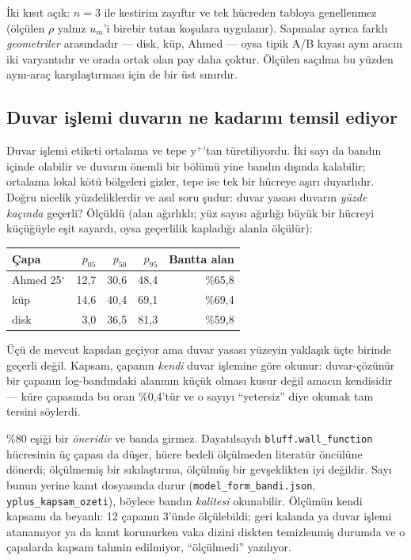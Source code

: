 \documentclass[11pt,a4paper]{article}
\begin{document}
\noindent İki kısıt açık: $n{=}3$ ile kestirim zayıftır ve tek hücreden tabloya
genellenmez (ölçülen $\rho$ yalnız $u_m$'i birebir tutan koşulara uygulanır).
Sapmalar ayrıca farklı \emph{geometriler} arasındadır --- disk, küp, Ahmed ---
oysa tipik A/B kıyası aynı aracın iki varyantıdır ve orada ortak olan pay daha
çoktur. Ölçülen saçılma bu yüzden aynı-araç karşılaştırması için de bir üst
sınırdır.

\subsection{Duvar işlemi duvarın ne kadarını temsil ediyor}
\label{sub:yplus-kapsam}

Duvar işlemi etiketi ortalama ve tepe y$^+$'tan türetiliyordu. İki sayı da
bandın içinde olabilir ve duvarın önemli bir bölümü yine bandın dışında
kalabilir; ortalama lokal kötü bölgeleri gizler, tepe ise tek bir hücreye
aşırı duyarlıdır. Doğru nicelik yüzdeliklerdir ve asıl soru şudur: duvar
yasası duvarın \emph{yüzde kaçında} geçerli? Ölçüldü (alan ağırlıklı; yüz
sayısı ağırlığı büyük bir hücreyi küçüğüyle eşit sayardı, oysa geçerlilik
kapladığı alanla ölçülür):

\begin{center}
\begin{tabular}{lrrrr}
\toprule
Çapa & $p_{05}$ & $p_{50}$ & $p_{95}$ & Bantta alan \\
\midrule
Ahmed 25$^\circ$ & 12{,}7 & 30{,}6 & 48{,}4 & \%65{,}8 \\
küp & 14{,}6 & 40{,}4 & 69{,}1 & \%69{,}4 \\
disk & 3{,}0 & 36{,}5 & 81{,}3 & \%59{,}8 \\
\bottomrule
\end{tabular}
\end{center}

\noindent Üçü de mevcut kapıdan geçiyor ama duvar yasası yüzeyin yaklaşık
üçte birinde geçerli değil. Kapsam, çapanın \emph{kendi} duvar işlemine göre
okunur: duvar-çözünür bir çapanın log-bandındaki alanının küçük olması kusur
değil amacın kendisidir --- küre çapasında bu oran \%0{,}4'tür ve o sayıyı
``yetersiz'' diye okumak tam tersini söylerdi.

\%80 eşiği bir \emph{öneridir} ve banda girmez. Dayatılsaydı
\texttt{bluff.wall\_function} hücresinin üç çapası da düşer, hücre bedeli
ölçülmeden literatür öncülüne dönerdi; ölçülmemiş bir sıkılaştırma, ölçülmüş
bir gevşeklikten iyi değildir. Sayı bunun yerine kanıt dosyasında durur
(\texttt{model\_form\_bandi.json}, \texttt{yplus\_kapsam\_ozeti}), böylece
bandın \emph{kalitesi} okunabilir. Ölçümün kendi kapsamı da beyanlı: 12
çapanın 3'ünde ölçülebildi; geri kalanda ya duvar işlemi atanamıyor ya da
kanıt korunurken vaka dizini diskten temizlenmiş durumda ve o çapalarda
kapsam tahmin edilmiyor, ``ölçülmedi'' yazılıyor.
\end{document}
